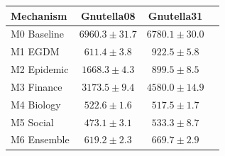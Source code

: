 \begin{tabular}{lccc}
  \toprule
  Mechanism & Gnutella08 & Gnutella31 \\
  \midrule
  M0 Baseline & $6960.3 \pm 31.7$ & $6780.1 \pm 30.0$ \\
  M1 EGDM & $611.4 \pm 3.8$ & $922.5 \pm 5.8$ \\
  M2 Epidemic & $1668.3 \pm 4.3$ & $899.5 \pm 8.5$ \\
  M3 Finance & $3173.5 \pm 9.4$ & $4580.0 \pm 14.9$ \\
  M4 Biology & $522.6 \pm 1.6$ & $517.5 \pm 1.7$ \\
  M5 Social & $473.1 \pm 3.1$ & $533.3 \pm 8.7$ \\
  M6 Ensemble & $619.2 \pm 2.3$ & $669.7 \pm 2.9$ \\
  \bottomrule
\end{tabular}